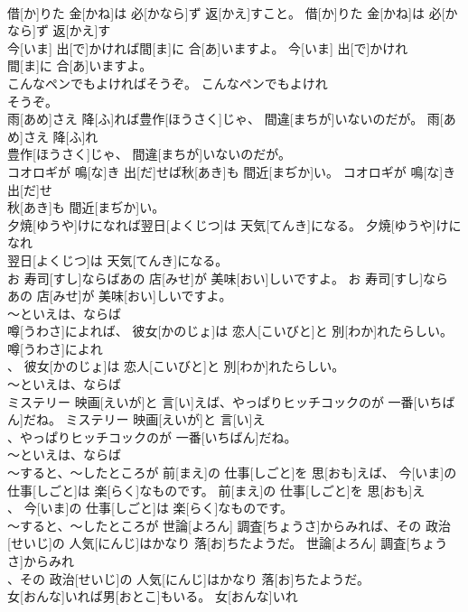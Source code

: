 \documentclass[8pt]{extreport}
\begin{document}
\begin{CJK}{UTF8}{min}
\\	借[か]りた 金[かね]は 必[かなら]ず 返[かえ]すこと。	借[か]りた 金[かね]は 必[かなら]ず 返[かえ]す
\\	今[いま] 出[で]かければ間[ま]に 合[あ]いますよ。	今[いま] 出[で]かけれ
\\	間[ま]に 合[あ]いますよ。	
\\	こんなペンでもよければそうぞ。	こんなペンでもよけれ
\\	そうぞ。	
\\	雨[あめ]さえ 降[ふ]れば豊作[ほうさく]じゃ、 間違[まちが]いないのだが。	雨[あめ]さえ 降[ふ]れ
\\	豊作[ほうさく]じゃ、 間違[まちが]いないのだが。	
\\	コオロギが 鳴[な]き 出[だ]せば秋[あき]も 間近[まぢか]い。	コオロギが 鳴[な]き 出[だ]せ
\\	秋[あき]も 間近[まぢか]い。	
\\	夕焼[ゆうや]けになれば翌日[よくじつ]は 天気[てんき]になる。	夕焼[ゆうや]けになれ
\\	翌日[よくじつ]は 天気[てんき]になる。	
\\	お 寿司[すし]ならばあの 店[みせ]が 美味[おい]しいですよ。	お 寿司[すし]なら
\\	あの 店[みせ]が 美味[おい]しいですよ。	
\\	～といえは、ならば
\\	噂[うわさ]によれば、 彼女[かのじょ]は 恋人[こいびと]と 別[わか]れたらしい。	噂[うわさ]によれ
\\	、 彼女[かのじょ]は 恋人[こいびと]と 別[わか]れたらしい。	
\\	～といえは、ならば
\\	ミステリー 映画[えいが]と 言[い]えば、やっぱりヒッチコックのが 一番[いちばん]だね。	ミステリー 映画[えいが]と 言[い]え
\\	、やっぱりヒッチコックのが 一番[いちばん]だね。	
\\	～といえは、ならば
\\	～すると、～したところが	前[まえ]の 仕事[しごと]を 思[おも]えば、 今[いま]の 仕事[しごと]は 楽[らく]なものです。	前[まえ]の 仕事[しごと]を 思[おも]え
\\	、 今[いま]の 仕事[しごと]は 楽[らく]なものです。	
\\	～すると、～したところが	世論[よろん] 調査[ちょうさ]からみれば、その 政治[せいじ]の 人気[にんじ]はかなり 落[お]ちたようだ。	世論[よろん] 調査[ちょうさ]からみれ
\\	、その 政治[せいじ]の 人気[にんじ]はかなり 落[お]ちたようだ。	
\\	女[おんな]いれば男[おとこ]もいる。	女[おんな]いれ

\end{CJK}
\end{document}
